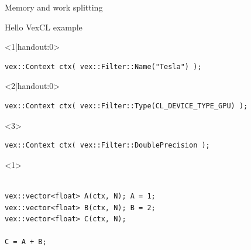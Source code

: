 \documentclass[@BEAMER_OPTIONS@]{beamer}
\begin{document}
\begin{frame}[fragile]{Memory and work splitting}
    \begin{exampleblock}{Hello VexCL example}
        \begin{onlyenv}<1|handout:0>
        \begin{lstlisting}[escapechar=!]
vex::Context ctx( vex::Filter::Name("Tesla") );
        \end{lstlisting}
        \end{onlyenv}
        \begin{onlyenv}<2|handout:0>
        \begin{lstlisting}[escapechar=!]
vex::Context ctx( vex::Filter::Type(CL_DEVICE_TYPE_GPU) );
        \end{lstlisting}
        \end{onlyenv}
        \begin{onlyenv}<3>
        \begin{lstlisting}[escapechar=!]
vex::Context ctx( vex::Filter::DoublePrecision );
        \end{lstlisting}
        \end{onlyenv}
        \begin{uncoverenv}<1>
        \begin{lstlisting}[firstnumber=last]

vex::vector<float> A(ctx, N); A = 1;
vex::vector<float> B(ctx, N); B = 2;
vex::vector<float> C(ctx, N);

C = A + B;
        \end{lstlisting}
        \end{uncoverenv}
    \end{exampleblock}
    \begin{figure}
\end{figure}
\end{frame}
\end{document}
